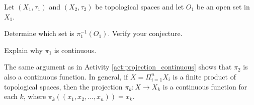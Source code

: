 \begin{activity} \label{act:projection_continuous} Let $(X_1, \tau_1)$ and $(X_2, \tau_2)$ be topological spaces and let $O_1$ be an open set in $X_1$. 
\ba
\item Determine which set is $\pi_1^{-1}(O_1)$. Verify your conjecture.

\item Explain why $\pi_1$ is continuous.

\ea

\end{activity}

\begin{comment}

\ActivitySolution

\ba
\item We will demonstrate that $\pi_1^{-1}(O_1) = O_1 \times X_2$. Let $(s,t) \in \pi_1^{-1}(O_1)$. Then $\pi_1((s,t)) = s \in O_1$. So $(s,t) \in O_1 \times X_2$ and $\pi_1^{-1}(O_1) \subseteq O_1 \times X_2$. Now let $(s,t) \in O_1 \times X_2$. Then $\pi_1((s,t)) = s \in O_1$ and $(s,t) \in \pi_1^{-1}(O_1)$. 

\item Recall that the sets $O_1 \times O_2$ with $O_1 \in \tau_1$ and $O_2 \in \tau_2$ form a basis for the product topology. Part (a) shows that the inverse image of an open set in $X_1$ under $\pi_1$ is open in $X_1 \times X_2$, so we conclude that $\pi_1$ is a continuous function.

\ea

\end{comment}

The same argument as in Activity \ref{act:projection_continuous} shows that $\pi_2$ is also a continuous function. In general, if $X = \Pi_{i=1}^n X_{i}$ is a finite product of topological spaces, then the projection $\pi_{k}: X \to X_{k}$ is a continuous function for each $k$, where $\pi_k((x_1,x_2, \ldots, x_n)) = x_k$. %

